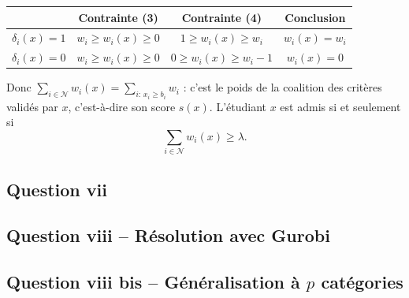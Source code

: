\documentclass[10pt,a4paper]{article}
\newcommand{\N}{\mathcal{N}}
\begin{document}
\begin{center}
\begin{tabular}{cccc}
\toprule
 & Contrainte (3) & Contrainte (4) & Conclusion \\
\midrule
$\delta_i(x)=1$ & $w_i\geq w_i(x)\geq 0$ & $1\geq w_i(x)\geq w_i$ & $w_i(x)=w_i$ \\
$\delta_i(x)=0$ & $w_i\geq w_i(x)\geq 0$ & $0\geq w_i(x)\geq w_i-1$ & $w_i(x)=0$ \\
\bottomrule
\end{tabular}
\end{center}

Donc $\sum_{i\in\N} w_i(x)=\sum_{i:\,x_i\geq b_i} w_i$ : c'est le poids de la coalition des critères validés par $x$,
c'est-à-dire son score $s(x)$. L'étudiant $x$ est admis si et seulement si
\[
\textstyle\sum_{i\in\N} w_i(x) \geq \lambda .
\]

\subsection*{Question vii}


\subsection*{Question viii -- Résolution avec Gurobi}


\subsection*{Question viii bis -- Généralisation à $p$ catégories}

\end{document}
